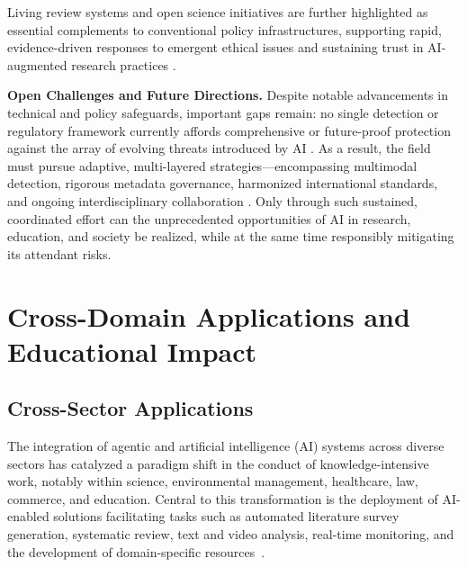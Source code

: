 \documentclass[sigconf]{acmart}
\begin{document}
Living review systems and open science initiatives are further highlighted as essential complements to conventional policy infrastructures, supporting rapid, evidence-driven responses to emergent ethical issues and sustaining trust in AI-augmented research practices \cite{ref43,ref61,ref70,ref84,ref86,ref95,ref100,ref101,ref106,ref110}.

\textbf{Open Challenges and Future Directions.}  
Despite notable advancements in technical and policy safeguards, important gaps remain: no single detection or regulatory framework currently affords comprehensive or future-proof protection against the array of evolving threats introduced by AI \cite{ref14,ref24,ref85,ref92,ref95,ref97}. As a result, the field must pursue adaptive, multi-layered strategies—encompassing multimodal detection, rigorous metadata governance, harmonized international standards, and ongoing interdisciplinary collaboration \cite{ref9,ref10,ref31,ref41,ref53,ref61,ref70,ref80,ref81,ref95,ref101,ref106,ref110}. Only through such sustained, coordinated effort can the unprecedented opportunities of AI in research, education, and society be realized, while at the same time responsibly mitigating its attendant risks.

\section{Cross-Domain Applications and Educational Impact}

\subsection{Cross-Sector Applications}

The integration of agentic and artificial intelligence (AI) systems across diverse sectors has catalyzed a paradigm shift in the conduct of knowledge-intensive work, notably within science, environmental management, healthcare, law, commerce, and education. Central to this transformation is the deployment of AI-enabled solutions facilitating tasks such as automated literature survey generation, systematic review, text and video analysis, real-time monitoring, and the development of domain-specific resources~\cite{ref6,ref7,ref8,ref9,ref10,ref14,ref25,ref26,ref27,ref28,ref29,ref30,ref40,ref45,ref58,ref59,ref76,ref80,ref86,ref88,ref91,ref92,ref93,ref94,ref95,ref96,ref97,ref98,ref99,ref100,ref104,ref109,ref110,ref111,ref112,ref113,ref114,ref115}. 
\end{document}
